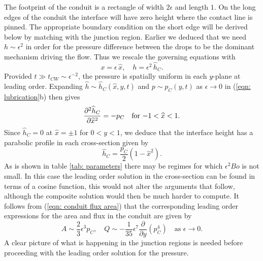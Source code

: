 \documentclass{jfm}
\newcommand{\pD}[3]{\frac{ \partial^{#3} {#1} }{ \partial {#2}^{#3} }}
\begin{document}
The footprint of the  conduit  is   a rectangle of  width $2\epsilon$ and length $1$.
On the long edges of the  conduit  the interface will have zero height where the contact line is pinned.
The appropriate boundary condition on the short edge will be derived below by matching with the junction region.
Earlier we deduced that we need $h\sim \epsilon^2 $ in order for the pressure difference between the drops to be the dominant  mechanism driving the flow.
Thus we  rescale the governing equations with  
\begin{equation*}
{x} = \epsilon \, \widehat{x},  \quad h= \epsilon^2 \,\widehat{h}_C.   
\end{equation*}
Provided $t \gg t_{CW}\sim \epsilon^{-2}$, the pressure is spatially uniform in each ${y}$-plane at leading order. Expanding $\widehat{h}\sim \widehat{h}_C(\widehat{x},y,t)$ and $ p\sim p_C(y,t)$ as $ \epsilon \to 0$ in  (\ref{eqn: lubrication}b) then gives
\begin{equation}
 \pD{\widehat{h}_C}{\widehat{x}}{2}=- p_C \quad \text{for $ -1 < \widehat{x}<1$.} \label{eqn: leading channel}
\end{equation} 
Since $\widehat{h}_C = 0$ at $ \widehat{x} = \pm1$  for $0 < y < 1$, we deduce that the interface height has a parabolic profile in  each cross-section given by  
\begin{equation}
\widehat{h}_C = \frac{p_C}{2} \left( 1-\widehat{x}^2  \right) . \label{eqn:  conduit  height}
\end{equation}
As is shown in table \ref{tab: parameters} there may be regimes for which $ \epsilon^2 Bo  $ is not small.   
In this case the leading order solution in the cross-section can   be found in terms of a  cosine function, this would  not alter the arguments that follow,  although the composite solution would then be much harder to compute.
It follows from (\ref{eqn:  conduit  flux area}) that the corresponding leading order expressions for the area and flux in the conduit  are given by
\label{eqn: area and flux}  
\begin{equation}
A \sim \frac{2}{3}\epsilon^3 p_C, \quad 
Q \sim -\frac{1}{35}  \epsilon^7  \pD{}{{y}}{}\left( p_C^4 \right) \quad \text{as $\epsilon \to 0$.}   \tag{\theequation a,b} 
\end{equation} 
A clear picture of what is happening  in the junction regions is needed before proceeding with the leading order solution for the pressure. 
\end{document}
